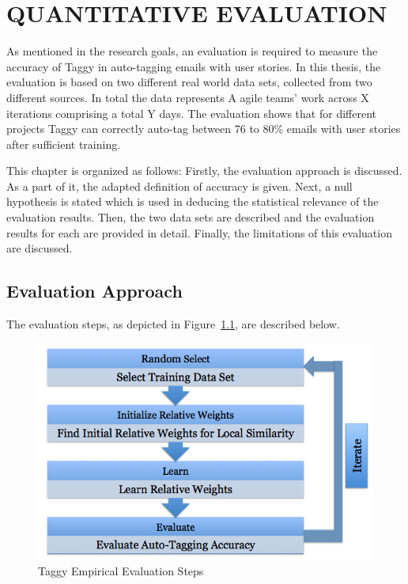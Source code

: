 \fancyhead[RO,LE]{\thepage}
\fancyfoot{} 
\chapter{QUANTITATIVE EVALUATION}
\label{ch:evaluation}
As mentioned in the research goals, an evaluation is required to measure the accuracy of Taggy in auto-tagging emails with user stories. In this thesis, the evaluation is based on two different real world data sets, collected from two different sources. In total the data represents A agile teams' work across X iterations comprising a total Y days. The evaluation shows that for different projects Taggy can correctly auto-tag between 76 to 80\% emails with user stories after sufficient training.

This chapter is organized as follows: Firstly, the evaluation approach is discussed. As a part of it, the adapted definition of accuracy is given. Next, a null hypothesis is stated which is used in deducing the statistical relevance of the evaluation results. Then, the two data sets are described and the evaluation results for each are provided in detail. Finally, the limitations of this evaluation are discussed.

\section{Evaluation Approach}
The evaluation steps, as depicted in Figure~\ref{fig:evaluation}, are described below.

\begin{figure}[tb]
	\centering
	\includegraphics[width=\textwidth]{Evaluation.png}
    \caption{Taggy Empirical Evaluation Steps}
	\label{fig:evaluation}
\end{figure}


